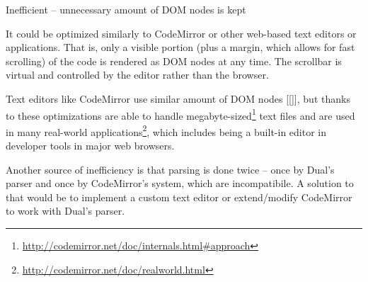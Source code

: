 Inefficient -- unnecessary amount of DOM nodes is kept

It could be optimized similarly to CodeMirror or other web-based text editors or applications. That is, only a visible portion (plus a margin, which allows for fast scrolling) of the code is rendered as DOM nodes at any time. The scrollbar is virtual and controlled by the editor rather than the browser.

Text editors like CodeMirror use similar amount of DOM nodes [[]], but thanks to these optimizations are able to handle megabyte-sized\footnote{\url{http://codemirror.net/doc/internals.html#approach}} text files and are used in many real-world applications\footnote{\url{http://codemirror.net/doc/realworld.html}}, which includes being a built-in editor in developer tools in major web browsers.

Another source of inefficiency is that parsing is done twice -- once by Dual's parser and once by CodeMirror's system, which are incompatibile.
A solution to that would be to implement a custom text editor or extend/modify CodeMirror to work with Dual's parser.


